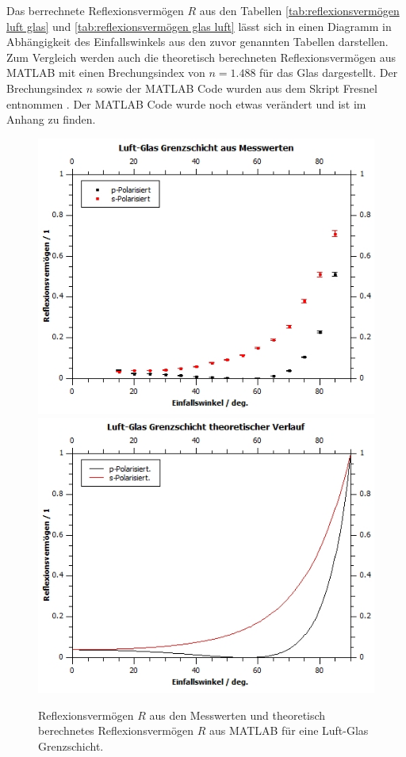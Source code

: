 \documentclass[12pt,a4paper,twoside]{article}
\begin{document}
\noindent
Das berrechnete Reflexionsvermögen $R$ aus den Tabellen \ref{tab:reflexionsvermögen luft glas} und \ref{tab:reflexionsvermögen glas luft} 
lässt sich in einen Diagramm in Abhängigkeit des Einfallswinkels aus den zuvor genannten Tabellen darstellen. Zum Vergleich werden auch die theoretisch berechneten Reflexionsvermögen aus MATLAB mit einen Brechungsindex von $n=1.488$ für das Glas dargestellt. 
Der Brechungsindex $n$ sowie der MATLAB Code wurden aus dem Skript Fresnel entnommen \cite{teachcenter2}. 
Der MATLAB Code wurde noch etwas verändert und ist im Anhang zu finden. 

\begin{figure}[H]
    \centering
    \includegraphics[width=0.6\linewidth]{nudes/LG Mess.jpg}
    \includegraphics[width=0.6\linewidth]{nudes/LG theor.jpg}
    \caption{Reflexionsvermögen $R$ aus den Messwerten und theoretisch berechnetes Reflexionsvermögen $R$ aus MATLAB für eine Luft-Glas Grenzschicht. }
    \label{fig:reflexionsvermögen LG}
\end{figure}
\end{document}
